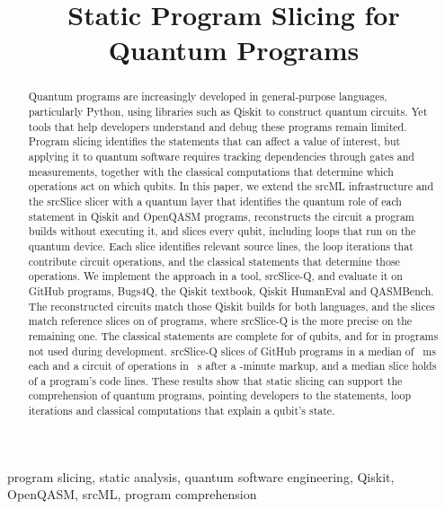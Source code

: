 \documentclass[10pt,conference]{IEEEtran}
\newcommand{\tool}{srcSlice-Q}
\begin{document}
\title{Static Program Slicing for Quantum Programs}
\author{}
\maketitle

\begin{abstract}
Quantum programs are increasingly developed in general-purpose languages, particularly Python, using libraries such as
Qiskit to construct quantum circuits. Yet tools that help developers understand and debug these programs remain
limited. Program slicing identifies the statements that can affect a value of interest, but applying it to quantum
software requires tracking dependencies through gates and measurements, together with the classical computations that
determine which operations act on which qubits. In this paper, we extend the srcML infrastructure and the srcSlice slicer with a quantum layer that identifies the
quantum role of each statement in Qiskit and OpenQASM programs, reconstructs the circuit a program builds without executing it, and slices every qubit,
including loops that run on the quantum device. Each slice identifies relevant source lines, the loop iterations that contribute circuit operations, and
the classical statements that determine those operations. We implement the approach in a tool, \tool{}, and
evaluate it on GitHub programs, Bugs4Q, the Qiskit textbook, Qiskit HumanEval and QASMBench. The reconstructed circuits
match those Qiskit builds for both languages, and the slices match reference slices on \numToolDevSliceEqual{} of \numToolDevPrograms{}
programs, where \tool{} is the more precise on the remaining one. The classical statements are complete for
\numSsContainPct{} of qubits, and for \numSsHeldContainPct{} in programs not used during development. \tool{} slices
\numScaleSOneSliced{} of \numScaleSOneFiles{} GitHub programs in a median of \numScaleSOneMedianMs{}~ms each and a
circuit of \numScaleQbMaxOps{} operations in \numScaleQbAllS{}~s after a \numScaleQbReadMin{}-minute markup, and a median slice holds \numScaleReadMedianPct{} of a
program's code lines. These results show that static slicing can support the comprehension of quantum programs,
pointing developers to the statements, loop iterations and classical computations that explain a qubit's state.
\end{abstract}

\begin{IEEEkeywords}
program slicing, static analysis, quantum software engineering, Qiskit, OpenQASM, srcML, program comprehension
\end{IEEEkeywords}













\end{document}
